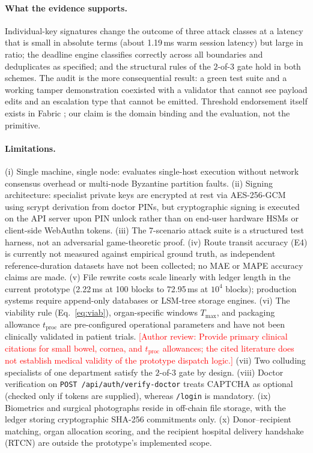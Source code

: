 \documentclass[journal]{IEEEtran}
\newcommand{\todo}[1]{\textcolor{red}{[#1]}}
\begin{document}
\paragraph*{What the evidence supports.}
Individual-key signatures change the outcome of three attack classes at a
latency that is small in absolute terms (about 1.19\,ms warm session latency) but large
in ratio; the deadline engine classifies correctly across all boundaries and deduplicates as
specified; and the structural rules of the $2$-of-$3$ gate hold in both
schemes. The audit is the more consequential result: a green test suite and
a working tamper demonstration coexisted with a validator that cannot see
payload edits and an escalation type that cannot be emitted. Threshold
endorsement itself exists in Fabric \cite{fabric2018}; our claim is the
domain binding and the evaluation, not the primitive.

\paragraph*{Limitations.}
(i) Single machine, single node: evaluates single-host execution without network consensus
overhead or multi-node Byzantine partition faults. (ii) Signing architecture: specialist private
keys are encrypted at rest via AES-256-GCM using scrypt derivation from doctor PINs, but
cryptographic signing is executed on the API server upon PIN unlock rather than on end-user
hardware HSMs or client-side WebAuthn tokens. (iii) The 7-scenario attack suite is a structured
test harness, not an adversarial game-theoretic proof. (iv) Route transit accuracy (E4) is currently
not measured against empirical ground truth, as independent reference-duration datasets have
not been collected; no MAE or MAPE accuracy claims are made. (v) File rewrite costs scale
linearly with ledger length in the current prototype (2.22\,ms at 100 blocks to 72.95\,ms at
$10^4$ blocks); production systems require append-only databases or LSM-tree storage engines.
(vi) The viability rule (Eq.~\ref{eq:viab}), organ-specific windows $T_{\max}$, and packaging
allowance $t_{\mathrm{proc}}$ are pre-configured operational parameters and have not been
clinically validated in patient trials.
\todo{Author review: Provide primary clinical citations for small bowel, cornea, and $t_{\mathrm{proc}}$ allowances; the cited literature does not establish medical validity of the prototype dispatch logic.}
(vii) Two colluding specialists of one department satisfy the $2$-of-$3$ gate by design.
(viii) Doctor verification on \texttt{POST /api/auth/verify-doctor} treats CAPTCHA as optional
(checked only if tokens are supplied), whereas \texttt{/login} is mandatory. (ix) Biometrics and
surgical photographs reside in off-chain file storage, with the ledger storing cryptographic
SHA-256 commitments only. (x) Donor--recipient matching, organ allocation scoring, and the
recipient hospital delivery handshake (RTCN) are outside the prototype's implemented scope.
\end{document}
